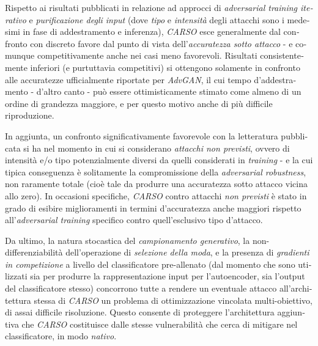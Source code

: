 \begin{otherlanguage}{italian}
Rispetto ai risultati pubblicati in relazione ad approcci di \textit{adversarial training iterativo} e \textit{purificazione degli input} (dove \textit{tipo} e \textit{intensità} degli attacchi sono i medesimi in fase di addestramento e inferenza), \textit{CARSO} esce generalmente dal confronto con discreto favore dal punto di vista dell'\textit{accuratezza sotto attacco} - e comunque competitivamente anche nei casi meno favorevoli. Risultati consistentemente inferiori (e purtuttavia competitivi) si ottengono solamente in confronto alle accuratezze ufficialmente riportate per \textit{AdvGAN}, il cui tempo d'addestramento - d'altro canto - può essere ottimisticamente stimato come almeno di un ordine di grandezza maggiore, e per questo motivo anche di più difficile riproduzione.

In aggiunta, un confronto significativamente favorevole con la letteratura pubblicata si ha nel momento in cui si considerano \textit{attacchi non previsti}, ovvero di intensità e/o tipo potenzialmente diversi da quelli considerati in \textit{training} - e la cui tipica conseguenza è solitamente la compromissione della \textit{adversarial robustness}, non raramente totale (cioè tale da produrre una accuratezza sotto attacco vicina allo zero). In occasioni specifiche, \textit{CARSO} contro attacchi \textit{non previsti} è stato in grado di esibire miglioramenti in termini d'accuratezza anche maggiori rispetto all'\textit{adversarial training} specifico contro quell'esclusivo tipo d'attacco.

Da ultimo, la natura stocastica del \textit{campionamento generativo}, la non-differenziabilità dell'operazione di \textit{selezione della moda}, e la presenza di \textit{gradienti in competizione} a livello del classificatore pre-allenato (dal momento che sono utilizzati sia per produrre la rappresentazione input per l'autoencoder, sia l'output del classificatore stesso) concorrono tutte a rendere un eventuale attacco all'architettura stessa di \textit{CARSO} un problema di ottimizzazione vincolata multi-obiettivo, di assai difficile risoluzione. Questo consente di proteggere l'architettura aggiuntiva che \textit{CARSO} costituisce dalle stesse vulnerabilità che cerca di mitigare nel classificatore, in modo \textit{nativo}.

\end{otherlanguage}